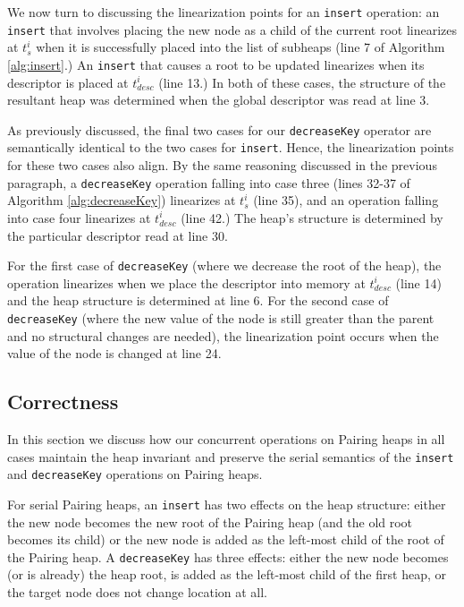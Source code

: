 \documentclass{acm_proc_article-sp}
\begin{document}
We now turn to discussing the linearization points for an \texttt{insert} operation:
an \texttt{insert} that involves placing the new node as a child of the current root
linearizes at $t_s^i$
when it is successfully placed into the list of subheaps (line 7 of Algorithm \ref{alg:insert}.)
An \texttt{insert} that causes a root to be updated linearizes when its descriptor
is placed at $t_{desc}^i$ (line 13.) In both of these cases, the structure of the resultant heap
was determined when the global descriptor was read at line 3.

As previously discussed, the final two cases for our \texttt{decreaseKey} operator
are semantically identical to the two cases for \texttt{insert}. Hence, the
linearization points for these two cases also align. By the same reasoning discussed
in the previous paragraph, a \texttt{decreaseKey} operation falling into
case three (lines 32-37 of Algorithm \ref{alg:decreaseKey}) linearizes at $t_s^i$ (line 35),
and an operation falling into case four linearizes at $t_{desc}^i$ (line 42.) The heap's structure
is determined by the particular descriptor read at line 30.

For the first case of \texttt{decreaseKey} (where we decrease the root of the heap), the operation
linearizes when we place the descriptor into memory at $t_{desc}^i$ (line 14)
and the heap structure is determined
at line 6. For the second case of \texttt{decreaseKey} (where the new value of the node is still
greater than the parent and no structural changes are needed), the linearization point occurs
when the value of the node is changed at line 24.

\subsection{Correctness}
\label{sec:ph:correct}
In this section we discuss how our concurrent
operations on Pairing heaps in all cases maintain the heap invariant
and preserve the serial semantics
of the \texttt{insert} and \texttt{decreaseKey} operations on Pairing heaps.

For serial Pairing heaps, an \texttt{insert} has two effects on the
heap structure: either the new
node becomes the new root of the Pairing heap (and the old root becomes its child)
or the new node is added as the left-most child of the root of the Pairing heap.
A \texttt{decreaseKey} has three effects: either the new node becomes (or is already)
the heap root, is added as the left-most child of the first heap, or the target
node does not change location at all.
\end{document}
